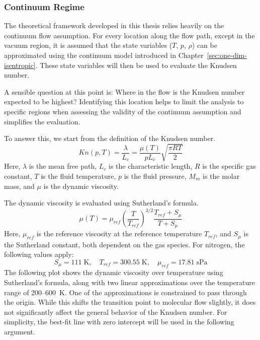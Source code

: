 \subsubsection*{Continuum Regime}
	The theoretical framework developed in this thesis relies heavily on the continuum flow assumption.
	For every location along the flow path, except in the vacuum region, it is assumed that the state variables ($T$, $p$, $\rho$) can be approximated using the continuum model introduced in Chapter~\ref{sec:one-dim-isentropic}.
	These state variables will then be used to evaluate the Knudsen number.

	A sensible question at this point is: Where in the flow is the Knudsen number expected to be highest?
	Identifying this location helps to limit the analysis to specific regions when assessing the validity of the continuum assumption and simplifies the evaluation.

	To answer this, we start from the definition of the Knudsen number.
	\cite{halwidl_development_2016, anderson2021modern}
	$$
		Kn(p,T) = \frac{\lambda}{L_c} = \frac{\mu(T)}{pL_c}\sqrt{\frac{\pi R T}{2}}
	$$
	Here, $\lambda$ is the mean free path, $L_c$ is the characteristic length, $R$ is the specific gas constant, $T$ is the fluid temperature, $p$ is the fluid pressure, $M_m$ is the molar mass, and $\mu$ is the dynamic viscosity.

	The dynamic viscosity is evaluated using Sutherland's formula.
	\cite{Hirschfelder1954MolecularTO}
	\begin{equation}
		\mu(T) = \mu_{ref} \left(\frac{T}{T_{ref}}\right)^{3/2} \frac{T_{ref} + S_\mu}{T + S_\mu}
		\label{eq:sutherland}
	\end{equation}
	Here, $\mu_{ref}$ is the reference viscosity at the reference temperature $T_{ref}$, and $S_\mu$ is the Sutherland constant, both dependent on the gas species.
	For nitrogen, the following values apply:
	\cite{kim2004numericalanalysisflowcharacteristics}
	$$
		S_\mu = 111\;\text{K}, \quad T_{ref} = 300.55\;\text{K}, \quad \mu_{ref} = 17.81\; \text{sPa}
	$$
	The following plot shows the dynamic viscosity over temperature using Sutherland's formula, along with two linear approximations over the temperature range of 200–600~K.
	One of the approximations is constrained to pass through the origin.
	While this shifts the transition point to molecular flow slightly, it does not significantly affect the general behavior of the Knudsen number.
	For simplicity, the best-fit line with zero intercept will be used in the following argument.
	\newpage
	
	
